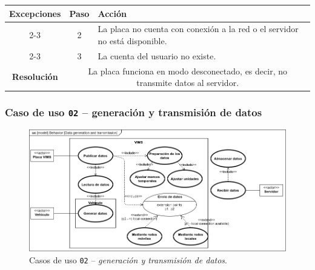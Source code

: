 \begin{table}[H]
\begin{tabularx}{\textwidth}{|c|c|X|}
    \hline
    \multirow{4}{*}{\textbf{Excepciones}}      & \textbf{Paso}                                                                                                          & \textbf{Acción}                                                                                                                    \\
    \cline{2-3}
                                               & 2                                                                                                                      & \multicolumn{1}{L|}{La placa no cuenta con conexión a la red o el servidor no está disponible.}                                    \\
    \cline{2-3}
                                               & 3                                                                                                                      & \multicolumn{1}{L|}{La cuenta del usuario no existe.}                                                                              \\
    \hline\hline
    \textbf{Resolución}                        & \multicolumn{2}{X|}{La placa funciona en modo desconectado, es decir, no transmite datos al servidor.}                                                                                                                                                      \\
    \hline
  \end{tabularx}
\end{table}

\subsubsection{Caso de uso \texttt{02} -- generación y transmisión de datos}

\begin{figure}[H]
  \centering
  \includegraphics[width=\linewidth]{diagrams/UseCases-UC2 - data.png}
  \caption{Casos de uso \texttt{02} -- \textit{generación y transmisión de datos}.}
  \label{uc:data}
\end{figure}

